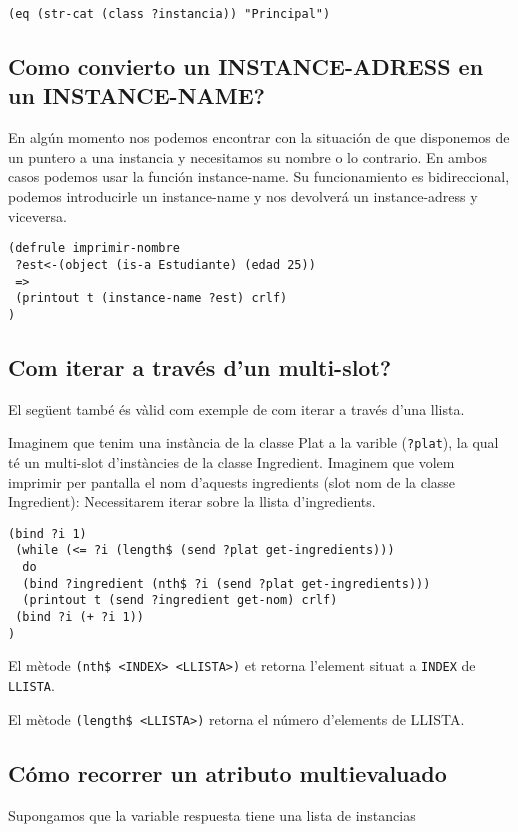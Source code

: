 \documentclass[11pt,svgnames]{scrbook}
\begin{document}
\texttt{(eq (str-cat  (class ?instancia)) "Principal")}


\subsection{Como convierto un INSTANCE-ADRESS en un INSTANCE-NAME?}

En algún momento nos podemos encontrar con la situación de que disponemos de un
puntero a una instancia y necesitamos su nombre o lo contrario. En ambos casos
podemos usar la función instance-name. Su funcionamiento es bidireccional,
podemos introducirle un instance-name y nos devolverá un instance-adress y
viceversa.

\begin{verbatim}
(defrule imprimir-nombre
 ?est<-(object (is-a Estudiante) (edad 25))
 =>
 (printout t (instance-name ?est) crlf)
)
\end{verbatim} 

\subsection{Com iterar a través d'un multi-slot?}


El següent també és vàlid com exemple de com iterar a través d'una llista.

Imaginem que tenim una instància de la classe Plat a la varible
(\texttt{?plat}), la qual té un
multi-slot d'instàncies de la classe Ingredient. Imaginem que volem imprimir per
pantalla el nom d'aquests ingredients (slot nom de la classe Ingredient):
Necessitarem iterar sobre la llista d'ingredients.

\begin{verbatim}
(bind ?i 1)
 (while (<= ?i (length$ (send ?plat get-ingredients)))
  do
  (bind ?ingredient (nth$ ?i (send ?plat get-ingredients)))
  (printout t (send ?ingredient get-nom) crlf)
 (bind ?i (+ ?i 1))
)
\end{verbatim} 

El mètode \texttt{(nth\$ <INDEX> <LLISTA>)} et retorna l'element situat a
\texttt{INDEX} de \texttt{LLISTA}. 

El mètode \texttt{(length\$ <LLISTA>)} retorna el número d'elements de LLISTA.


\subsection{Cómo recorrer un atributo multievaluado}

Supongamos que la variable respuesta tiene una lista de instancias
\end{document}
